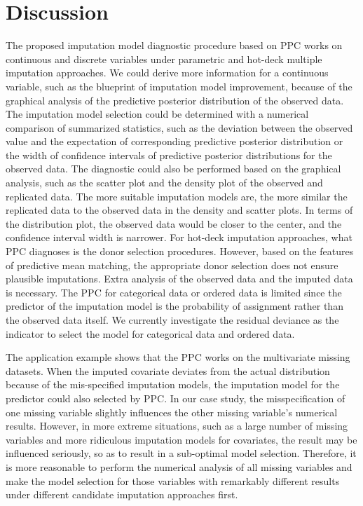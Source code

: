 	\section{Discussion}
	\label{sec:6.7}
	The proposed imputation model diagnostic procedure based on PPC works on continuous and discrete variables under parametric and hot-deck multiple imputation approaches. We could derive more information for a continuous variable, such as the blueprint of imputation model improvement, because of the graphical analysis of the predictive posterior distribution of the observed data. The imputation model selection could be determined with a numerical comparison of summarized statistics, such as the deviation between the observed value and the expectation of corresponding predictive posterior distribution or the width of confidence intervals of predictive posterior distributions for the observed data. The diagnostic could also be performed based on the graphical analysis, such as the scatter plot and the density plot of the observed and replicated data. The more suitable imputation models are, the more similar the replicated data to the observed data in the density and scatter plots. In terms of the distribution plot, the observed data would be closer to the center, and the confidence interval width is narrower. For hot-deck imputation approaches, what PPC diagnoses is the donor selection procedures. However, based on the features of predictive mean matching, the appropriate donor selection does not ensure plausible imputations. Extra analysis of the observed data and the imputed data is necessary. The PPC for categorical data or ordered data is limited since the predictor of the imputation model is the probability of assignment rather than the observed data itself. We currently investigate the residual deviance as the indicator to select the model for categorical data and ordered data. 
	
	The application example shows that the PPC works on the multivariate missing datasets. When the imputed covariate deviates from the actual distribution because of the mis-specified imputation models, the imputation model for the predictor could also selected by PPC. In our case study, the misspecification of one missing variable slightly influences the other missing variable's numerical results. However, in more extreme situations, such as a large number of missing variables and more ridiculous imputation models for covariates, the result may be influenced seriously, so as to result in a sub-optimal model selection. Therefore, it is more reasonable to perform the numerical analysis of all missing variables and make the model selection for those variables with remarkably different results under different candidate imputation approaches first. 
	
